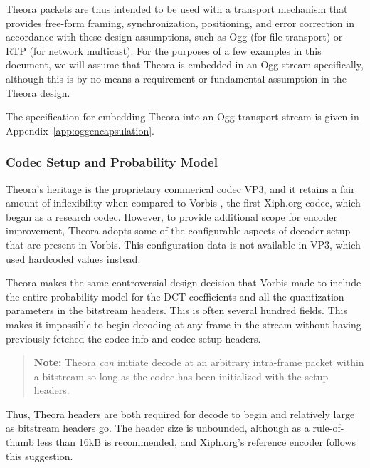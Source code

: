 \documentclass[11pt,letterpaper]{article}
\begin{document}
Theora packets are thus intended to be used with a transport mechanism that
 provides free-form framing, synchronization, positioning, and error correction
 in accordance with these design assumptions, such as Ogg (for file transport)
 or RTP (for network multicast).
For the purposes of a few examples in this document, we will assume that Theora
 is embedded in an Ogg stream specifically, although this is by no means a
 requirement or fundamental assumption in the Theora design.

The specification for embedding Theora into an Ogg transport stream is given in
 Appendix~\ref{app:oggencapsulation}.

\subsubsection{Codec Setup and Probability Model}

Theora's heritage is the proprietary commerical codec VP3, and it retains a
 fair amount of inflexibility when compared to Vorbis \cite{vorbis}, the first
 Xiph.org codec, which began as a research codec.
However, to provide additional scope for encoder improvement, Theora adopts
 some of the configurable aspects of decoder setup that are present in Vorbis.
This configuration data is not available in VP3, which used hardcoded values
 instead.

Theora makes the same controversial design decision that Vorbis made to include
 the entire probability model for the DCT coefficients and all the quantization
 parameters in the bitstream headers.
This is often several hundred fields.
This makes it impossible to begin decoding at any frame in the stream without
 having previously fetched the codec info and codec setup headers.

\begin{verse}
{\bf Note:} Theora {\em can} initiate decode at an arbitrary intra-frame packet
 within a bitstream so long as the codec has been initialized with the setup
 headers.
\end{verse}

Thus, Theora headers are both required for decode to begin and relatively large
 as bitstream headers go.
The header size is unbounded, although as a rule-of-thumb less than 16kB is
 recommended, and Xiph.org's reference encoder follows this suggestion.
\end{document}
